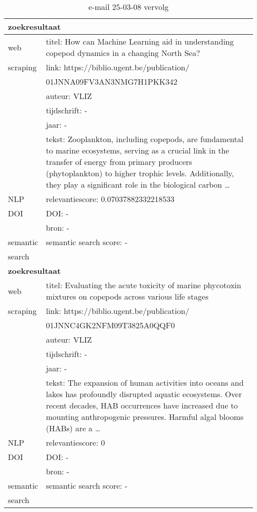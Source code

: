 \begin{table}[h!]
    \caption{e-mail 25-03-08 vervolg}
    \centering
    \begin{tabularx}{\textwidth}{|p{4cm}|X|} 
        \hline
        \multicolumn{2}{|X|}{\textbf{zoekresultaat}} \\
        \hline
        web &titel: How can Machine Learning aid in understanding copepod dynamics in a changing North Sea?\\
        scraping&link: https://biblio.ugent.be/publication/\\&01JNNA09FV3AN3NMG7H1PKK342\\
        &auteur: VLIZ\\
        &tijdschrift: -\\
        &jaar: -\\
        &tekst: Zooplankton, including copepods, are fundamental to marine ecosystems, serving as a crucial link in the transfer of energy from primary producers (phytoplankton) to higher trophic levels. Additionally, they play a significant role in the biological carbon …\\
        \hline
        NLP&relevantiescore: 0.07037882332218533\\
        \hline
        DOI&DOI: -\\
        &bron: -\\
        \hline
        semantic&semantic search score: -\\
        search&\\
        \hline
        \multicolumn{2}{|X|}{\textbf{zoekresultaat}} \\
        \hline
        web &titel: Evaluating the acute toxicity of marine phycotoxin mixtures on copepods across various life stages\\
        scraping&link: https://biblio.ugent.be/publication/\\&01JNNC4GK2NFM09T3825A0QQF0\\
        &auteur: VLIZ\\
        &tijdschrift: -\\
        &jaar: -\\
        &tekst: The expansion of human activities into oceans and lakes has profoundly disrupted aquatic ecosystems. Over recent decades, HAB occurrences have increased due to mounting anthropogenic pressures. Harmful algal blooms (HABs) are a …\\
        \hline
        NLP&relevantiescore: 0\\
        \hline
        DOI&DOI: -\\
        &bron: -\\
        \hline
        semantic&semantic search score: -\\
        search&\\
        \hline
    \end{tabularx}
    \label{table:email20250308vervolg}
\end{table}
